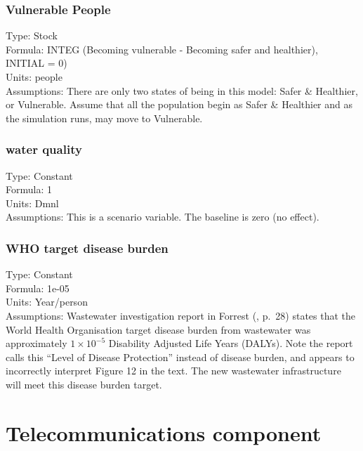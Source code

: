 \documentclass[
  11pt,
]{book}
\begin{document}
\hypertarget{vulnerable-people}{%
\subsection{Vulnerable People}\label{vulnerable-people}}

Type: Stock\\
Formula: INTEG (Becoming vulnerable - Becoming safer and healthier), INITIAL = 0)\\
Units: people\\
Assumptions: There are only two states of being in this model: Safer \& Healthier, or Vulnerable. Assume that all the population begin as Safer \& Healthier and as the simulation runs, may move to Vulnerable.

\hypertarget{water-quality}{%
\subsection{water quality}\label{water-quality}}

Type: Constant\\
Formula: 1\\
Units: Dmnl\\
Assumptions: This is a scenario variable. The baseline is zero (no effect).

\hypertarget{who-target-disease-burden}{%
\subsection{WHO target disease burden}\label{who-target-disease-burden}}

Type: Constant\\
Formula: 1e-05\\
Units: Year/person\\
Assumptions: Wastewater investigation report in Forrest (\citet{decentralised_water_consulting_forrest_2019}, p.~28) states that the World Health Organisation target disease burden from wastewater was approximately \(1 \times 10^{-5}\) Disability Adjusted Life Years (DALYs). Note the \citet{decentralised_water_consulting_forrest_2019} report calls this ``Level of Disease Protection'' instead of disease burden, and appears to incorrectly interpret Figure 12 in the text. The new wastewater infrastructure will meet this disease burden target.

\hypertarget{telecommunications-component}{%
\chapter{Telecommunications component}\label{telecommunications-component}}
\end{document}
